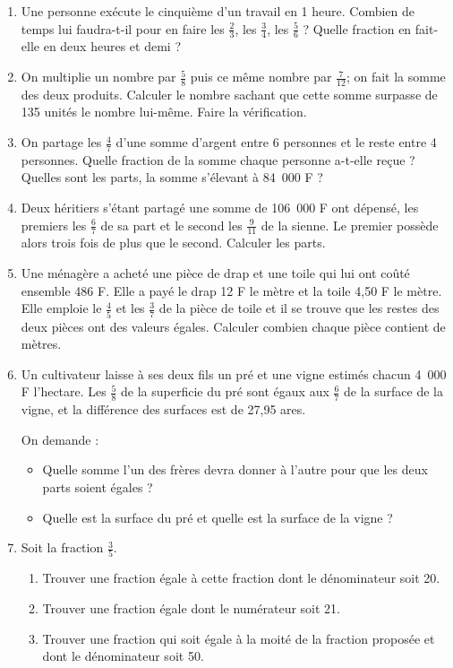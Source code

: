 \documentclass[12 pt]{report}
\theoremstyle{plain}
\newcounter{n}
\begin{document}
\begin{enumerate}
\item Une personne exécute le cinquième d'un travail en 1 heure. Combien de temps lui faudra-t-il pour en 
faire les $\frac23$, les $\frac34$, les $\frac56$ ?
Quelle fraction en fait-elle en deux heures et demi ? 
\item On multiplie un nombre par $\frac58$ puis ce même nombre par $\frac7{12}$; on fait la somme des deux produits. Calculer le nombre sachant que cette somme surpasse de 135 unités le nombre lui-même. Faire la vérification. 
\item On partage les $\frac47$ d'une somme d'argent entre 6 personnes et le reste entre 4 personnes. 
Quelle fraction de la somme chaque personne a-t-elle 
reçue ? Quelles sont les parts, la somme s'élevant à 84~000 F ? 
\item Deux héritiers s'étant partagé une somme de 106~000 F ont dépensé, les premiers les $\frac67$ de sa part et le second les $\frac9{11}$ de la sienne. Le premier possède alors trois fois de plus que le second. Calculer les parts. 
\item Une ménagère a acheté une pièce de drap et une toile qui lui ont coûté ensemble 486 F. Elle a payé le drap 12 F le mètre et la toile 4,50 F le mètre. Elle emploie le $\frac45$ et les $\frac37$ de la pièce de toile et il se trouve que les restes des deux pièces ont des valeurs égales. Calculer combien chaque pièce contient de mètres. 
\item Un cultivateur laisse à ses deux fils un pré et une vigne estimés chacun 4~000 F l'hectare. Les $\frac58$ de la superficie du pré sont égaux aux $\frac67$ de la surface de la vigne, et la différence des surfaces est de 27,95 ares. 

On demande : \begin{itemize}
\item Quelle somme l'un des frères devra donner à l'autre pour que les deux parts soient égales ? 
\item Quelle est la surface du pré et quelle est la surface de la vigne ? 
\end{itemize}
\item Soit la fraction $\frac35$. 
\begin{enumerate}
\item Trouver une fraction égale à cette fraction dont le dénominateur soit 20. 
\item Trouver une fraction égale dont le numérateur soit 21. 
\item Trouver une fraction qui soit égale à la moité de la fraction proposée et dont le dénominateur soit 50. 
\end{enumerate} 
 \end{enumerate}
 
\end{document}

